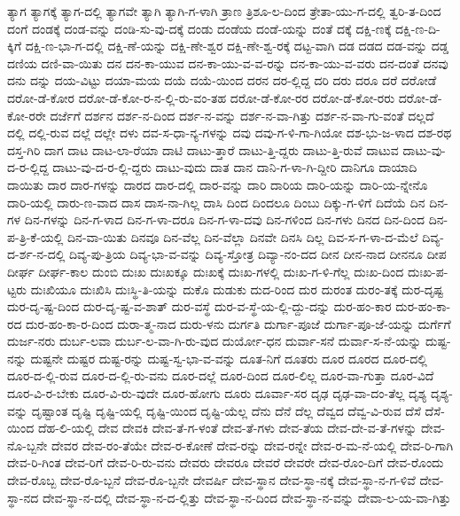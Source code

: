 {ತ್ಯಾಗ
ತ್ಯಾಗಕ್ಕೆ
ತ್ಯಾಗ-ದಲ್ಲಿ
ತ್ಯಾಗವೇ
ತ್ಯಾಗಿ
ತ್ಯಾಗಿ-ಗ-ಳಾಗಿ
ತ್ರಾಣ
ತ್ರಿಶೂ-ಲ-ದಿಂದ
ತ್ರೇತಾ-ಯು-ಗ-ದಲ್ಲಿ
ತ್ವರಿ-ತ-ದಿಂದ
ದಂಗೆ
ದಂಡಕ್ಕೆ
ದಂಡ-ವನ್ನು
ದಂಡಿ-ಸು-ವು-ದಕ್ಕೆ
ದಂಡು
ದಂಡೆಯ
ದಂಡೆ-ಯನ್ನು
ದಂತೆ
ದಕ್ಕೆ
ದಕ್ಷಿ-ಣಕ್ಕೆ
ದಕ್ಷಿ-ಣ-ದಿ-ಕ್ಕಿಗೆ
ದಕ್ಷಿ-ಣ-ಭಾ-ಗ-ದಲ್ಲಿ
ದಕ್ಷಿ-ಣೆ-ಯನ್ನು
ದಕ್ಷಿ-ಣೇ-ಶ್ವರ
ದಕ್ಷಿ-ಣೇ-ಶ್ವ-ರಕ್ಕೆ
ದಟ್ಟ-ವಾಗಿ
ದಡ
ದಡದ
ದಡ-ವನ್ನು
ದಡ್ಡ
ದಣಿಯ
ದಣಿ-ವಾ-ಯಿತು
ದನ
ದನ-ಕಾ-ಯುವ
ದನ-ಕಾ-ಯು-ವ-ವ-ರನ್ನು
ದನ-ಕಾ-ಯು-ವ-ವರು
ದನ-ದಂತೆ
ದನವು
ದನು
ದನ್ನು
ದಯ-ವಿಟ್ಟು
ದಯಾ-ಮಯ
ದಯೆ
ದಯೆ-ಯಿಂದ
ದರನ
ದರ-ಲ್ಲಿದ್ದ
ದರಿ
ದರು
ದರೂ
ದರೆ
ದರೋಡೆ
ದರೋ-ಡೆ-ಕೋರ
ದರೋ-ಡೆ-ಕೋ-ರ-ನ-ಲ್ಲಿ-ರು-ವಂ-ತಹ
ದರೋ-ಡೆ-ಕೋ-ರರ
ದರೋ-ಡೆ-ಕೋ-ರರು
ದರೋ-ಡೆ-ಕೋ-ರರೇ
ದರ್ಜೆಗೆ
ದರ್ಶನ
ದರ್ಶ-ನ-ದಿಂದ
ದರ್ಶ-ನ-ವನ್ನು
ದರ್ಶ-ನ-ವಾ-ಗಿತ್ತು
ದರ್ಶ-ನ-ವಾ-ಗು-ವಂತೆ
ದಲ್ಲದೆ
ದಲ್ಲಿ
ದಲ್ಲಿ-ರುವ
ದಲ್ಲೆ
ದಲ್ಲೇ
ದಳು
ದವ-ಸ-ಧಾ-ನ್ಯ-ಗಳನ್ನು
ದವು
ದವು-ಗ-ಳಿ-ಗಾ-ಗಿಯೋ
ದಶ-ಭು-ಜ-ಳಾದ
ದಶ-ರಥ
ದಸ್ತ-ಗಿರಿ
ದಾಗ
ದಾಟ
ದಾಟ-ಲಾ-ರೆಯಾ
ದಾಟಿ
ದಾಟು-ತ್ತಾರೆ
ದಾಟು-ತ್ತಿ-ದ್ದರು
ದಾಟು-ತ್ತಿ-ರುವೆ
ದಾಟುವ
ದಾಟು-ವು-ದ-ರ-ಲ್ಲಿದ್ದ
ದಾಟು-ವು-ದ-ರ-ಲ್ಲಿ-ದ್ದರು
ದಾಟು-ವುದು
ದಾತ
ದಾನ
ದಾನಿ-ಗ-ಳಾ-ಗಿ-ದ್ದೀರಿ
ದಾನಿಗೂ
ದಾಯಾದಿ
ದಾಯಿತು
ದಾರ
ದಾರ-ಗಳನ್ನು
ದಾರದ
ದಾರ-ದಲ್ಲಿ
ದಾರ-ವನ್ನು
ದಾರಿ
ದಾರಿಯ
ದಾರಿ-ಯನ್ನು
ದಾರಿ-ಯ-ನ್ನೇನೊ
ದಾರಿ-ಯಲ್ಲಿ
ದಾರು-ಣ-ವಾದ
ದಾಸ
ದಾಸ-ನಾ-ಗಿಲ್ಲ
ದಾಸಿ
ದಿಂದ
ದಿಂದಲೂ
ದಿಂಬು
ದಿಕ್ಕು-ಗ-ಳಿಗೆ
ದಿದೆಯೆ
ದಿನ
ದಿನ-ಗಳ
ದಿನ-ಗಳನ್ನು
ದಿನ-ಗ-ಳಾದ
ದಿನ-ಗ-ಳಾ-ದರೂ
ದಿನ-ಗ-ಳಾ-ದವು
ದಿನ-ಗಳಿಂದ
ದಿನ-ಗಳು
ದಿನದ
ದಿನ-ದಿಂದ
ದಿನ-ಪ-ತ್ರಿ-ಕೆ-ಯಲ್ಲಿ
ದಿನ-ವಾ-ಯಿತು
ದಿನವೂ
ದಿನ-ವೆಲ್ಲ
ದಿನ-ವೆಲ್ಲಾ
ದಿನವೇ
ದಿನಸಿ
ದಿಲ್ಲ
ದಿವ-ಸ-ಗ-ಳಾ-ದ-ಮೆಲೆ
ದಿವ್ಯ-ದ-ರ್ಶ-ನ-ದಲ್ಲಿ
ದಿವ್ಯ-ಪು-ತ್ರಿಯ
ದಿವ್ಯ-ಭಾ-ವ-ವನ್ನು
ದಿವ್ಯ-ಸ್ತೋತ್ರ
ದಿವ್ಯಾ-ನಂ-ದದ
ದೀನ
ದೀನ-ನಾದ
ದೀನನೂ
ದೀಪ
ದೀರ್ಘ
ದೀರ್ಘ-ಕಾಲ
ದುಂಬಿ
ದುಃಖ
ದುಃಖಕ್ಕೂ
ದುಃಖಕ್ಕೆ
ದುಃಖ-ಗಳಲ್ಲಿ
ದುಃಖ-ಗ-ಳಿ-ಗೆಲ್ಲ
ದುಃಖ-ದಿಂದ
ದುಃಖ-ಪ-ಟ್ಟರು
ದುಃಖಿಯೂ
ದುಃಖಿಸಿ
ದುಃಸ್ಥಿ-ತಿ-ಯನ್ನು
ದುಕೊ
ದುಡುಕು
ದುದ-ರಿಂದ
ದುರ
ದುರಂತ
ದುರಂ-ತಕ್ಕೆ
ದುರ-ದೃಷ್ಟ
ದುರ-ದೃ-ಷ್ಟ-ದಿಂದ
ದುರ-ದೃ-ಷ್ಟ-ವ-ಶಾತ್
ದುರ-ವಸ್ಥೆ
ದುರ-ವ-ಸ್ಥೆ-ಯ-ಲ್ಲಿ-ದ್ದು-ದನ್ನು
ದುರ-ಹಂ-ಕಾರ
ದುರ-ಹಂ-ಕಾ-ರದ
ದುರ-ಹಂ-ಕಾ-ರ-ದಿಂದ
ದುರಾ-ತ್ಮ-ನಾದ
ದುರು-ಳನು
ದುರ್ಗತಿ
ದುರ್ಗಾ-ಪೂಜೆ
ದುರ್ಗಾ-ಪೂ-ಜೆ-ಯನ್ನು
ದುರ್ಗೆಗೆ
ದುರ್ಜ-ನರು
ದುರ್ಬ-ಲವಾ
ದುರ್ಬ-ಲ-ವಾ-ಗಿ-ರು-ವುದ
ದುರ್ಯೋ-ಧನ
ದುರ್ವಾ-ಸನೆ
ದುರ್ವಾ-ಸ-ನೆ-ಯನ್ನು
ದುಷ್ಟ-ನನ್ನು
ದುಷ್ಟನೇ
ದುಷ್ಟರ
ದುಷ್ಟ-ರನ್ನು
ದುಷ್ಟ-ಸ್ವ-ಭಾ-ವ-ವನ್ನು
ದೂತ-ನಿಗೆ
ದೂತರು
ದೂರ
ದೂರದ
ದೂರ-ದಲ್ಲಿ
ದೂರ-ದ-ಲ್ಲಿ-ರುವ
ದೂರ-ದ-ಲ್ಲಿ-ರು-ವನು
ದೂರ-ದಲ್ಲೆ
ದೂರ-ದಿಂದ
ದೂರ-ಲಿಲ್ಲ
ದೂರ-ವಾ-ಗುತ್ತಾ
ದೂರ-ವಿದೆ
ದೂರ-ವಿ-ರ-ಬೇಕು
ದೂರ-ವಿ-ರು-ವುದೇ
ದೂರ-ಹೋಗು
ದೂರು
ದೂರ್ವಾ-ಸರ
ದೃಢ
ದೃಢ-ವಾ-ದಂ-ತೆಲ್ಲ
ದೃಶ್ಯ
ದೃಶ್ಯ-ವನ್ನು
ದೃಷ್ಟಾಂತ
ದೃಷ್ಟಿ
ದೃಷ್ಟಿ-ಯಲ್ಲಿ
ದೃಷ್ಟಿ-ಯಿಂದ
ದೃಷ್ಟಿ-ಯೆಲ್ಲ
ದೆನು
ದೆನೆ
ದೆಲ್ಲ
ದೆವ್ವದ
ದೆವ್ವ-ವಿ-ರುವ
ದೆಸೆ
ದೆಸೆ-ಯಿಂದ
ದೆಹ-ಲಿ-ಯಲ್ಲಿ
ದೇವ
ದೇವಕಿ
ದೇವ-ತೆ-ಗ-ಳಂತೆ
ದೇವ-ತೆ-ಗಳು
ದೇವ-ತೆಯ
ದೇವ-ದೇ-ವ-ತೆ-ಗಳನ್ನು
ದೇವ-ನೊ-ಬ್ಬನೇ
ದೇವರ
ದೇವ-ರಂ-ತೆಯೇ
ದೇವ-ರ-ಕೋಣೆ
ದೇವ-ರನ್ನು
ದೇವ-ರನ್ನೇ
ದೇವ-ರ-ಮ-ನೆ-ಯಲ್ಲಿ
ದೇವ-ರಿ-ಗಾಗಿ
ದೇವ-ರಿ-ಗಿಂತ
ದೇವ-ರಿಗೆ
ದೇವ-ರಿ-ರು-ವನು
ದೇವರು
ದೇವರೂ
ದೇವರೆ
ದೇವರೇ
ದೇವ-ರೊಂ-ದಿಗೆ
ದೇವ-ರೊಂದು
ದೇವ-ರೊಬ್ಬ
ದೇವ-ರೊ-ಬ್ಬನೆ
ದೇವ-ರೊ-ಬ್ಬನೇ
ದೇವರ್ಷಿ
ದೇವ-ಸ್ಥಾನ
ದೇವ-ಸ್ಥಾ-ನಕ್ಕೆ
ದೇವ-ಸ್ಥಾ-ನ-ಗ-ಳಿವೆ
ದೇವ-ಸ್ಥಾ-ನದ
ದೇವ-ಸ್ಥಾ-ನ-ದಲ್ಲಿ
ದೇವ-ಸ್ಥಾ-ನ-ದ-ಲ್ಲಿತ್ತು
ದೇವ-ಸ್ಥಾ-ನ-ದಿಂದ
ದೇವ-ಸ್ಥಾ-ನ-ವನ್ನು
ದೇವಾ-ಲ-ಯ-ವಾ-ಗಿತ್ತು
}
